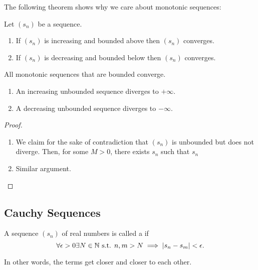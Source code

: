 \documentclass{book}
\begin{document}
The following theorem shows why we care about monotonic sequences:

\begin{thm}
    Let $(s_n)$ be a sequence. 

    \begin{enumerate}
        \item If $(s_n)$ is increasing and bounded above then $(s_n)$ converges.
        \item If $(s_n)$ is decreasing and bounded below then $(s_n)$ converges.
    \end{enumerate}
\end{thm}

\begin{corollary}
    All monotonic sequences that are bounded converge.
\end{corollary}

\begin{thm}
    \begin{enumerate}
        \item An increasing unbounded sequence diverges to $+\infty$.
        \item A decreasing unbounded sequence diverges to $-\infty$.
    \end{enumerate}
\end{thm}

\begin{proof} $\qquad$
    \begin{enumerate}
        \item We claim for the sake of contradiction that $(s_n)$ is unbounded but does not diverge. Then, for some $M > 0$, there exists $s_n$ such that $s_n$
        \item Similar argument.
    \end{enumerate}
\end{proof}

\subsection{Cauchy Sequences}

\begin{defn}
    A sequence $(s_n)$ of real numbers is called a  if \[\forall \epsilon > 0 \exists N \in \mathbb{N} \textrm{ s.t. } n, m > N \implies |s_n - s_m| < \epsilon.\] 
    
    In other words, the terms get closer and closer to each other.
\end{defn}
\end{document}
